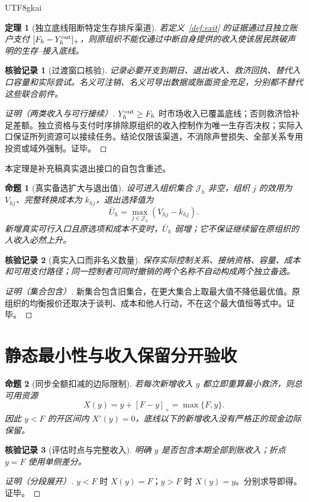 \documentclass[12pt,a4paper,openany]{report}
\newtheorem{theorem}{定理}[chapter]
\newtheorem{proposition}{命题}[chapter]
\newtheorem{Certificate}{核验记录}[chapter]
\begin{document}
\begin{CJK*}{UTF8}{gkai}
\begin{theorem}[独立底线阻断特定生存排斥渠道]
\label{thm:exit}
若定义~\ref{def:exit} 的证据通过且独立账户支付 $[F_h-Y_h^{\rm out}]_+$，则原组织不能仅通过中断自身提供的收入使该居民跌破声明的生存--接入底线。
\end{theorem}
\begin{Certificate}[过渡窗口核验]
记录必要开支到期日、退出收入、救济回执、替代入口容量和实际尝试。名义可注销、名义可导出数据或账面资金充足，分别都不替代这些联合前件。
\end{Certificate}
\begin{proof}[证明（两类收入与可行接续）]
$Y_h^{\rm out}\ge F_h$ 时市场收入已覆盖底线；否则救济恰补足差额。独立资格与支付时序排除原组织的收入控制作为唯一生存否决权；实际入口保证所列资源可以接续任务。结论仅限该渠道，不消除声誉损失、全部关系专用投资或域外强制。证毕。
\end{proof}
本定理是补充稿真实退出接口的自包含重述\cite{SourceSupplement}。

\begin{proposition}[真实备选扩大与退出值]
\label{prop:outside-option}
设可进入组织集合 $\mathcal J_h$ 非空，组织 $j$ 的效用为 $V_{hj}$、完整转换成本为 $k_{hj}$，退出选择值为
\[
 \bar U_h=\max_{j\in\mathcal J_h}(V_{hj}-k_{hj}).
\]
新增真实可行入口且原选项和成本不变时，$\bar U_h$ 弱增；它不保证继续留在原组织的人收入必然上升。
\end{proposition}
\begin{Certificate}[真实入口而非名义数量]
保存实际控制关系、接纳资格、容量、成本和可用支付路径；同一控制者可同时撤销的两个名称不自动构成两个独立备选。
\end{Certificate}
\begin{proof}[证明（集合包含）]
新集合包含旧集合，在更大集合上取最大值不降低最优值。原组织的均衡报价还取决于谈判、成本和他人行动，不在这个最大值恒等式中。证毕。
\end{proof}

\section{静态最小性与收入保留分开验收}
\begin{proposition}[同步全额扣减的边际限制]
\label{prop:clawback}
若每次新增收入 $y$ 都立即重算最小救济，则总可用资源
\[
 X(y)=y+[F-y]_+=\max\{F,y\}.
\]
因此 $y<F$ 的开区间内 $X'(y)=0$，底线以下的新增收入没有严格正的现金边际保留。
\end{proposition}
\begin{Certificate}[评估时点与完整收入]
明确 $y$ 是否包含本期全部到账收入；折点 $y=F$ 使用单侧差分。
\end{Certificate}
\begin{proof}[证明（分段展开）]
$y<F$ 时 $X(y)=F$；$y>F$ 时 $X(y)=y$。分别求导即得。证毕。
\end{proof}


\end{CJK*}
\end{document}
